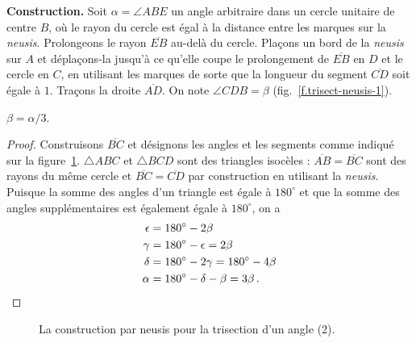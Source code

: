 \noindent\textbf{Construction.}
Soit $\alpha=\angle ABE$ un angle arbitraire dans un cercle unitaire de centre $B$, où le rayon du cercle est égal à la distance entre les marques sur la \emph{neusis}. Prolongeons le rayon $\overline{EB}$ au-delà du cercle. Plaçons un bord de la \emph{neusis} sur $A$ et déplaçons-la  jusqu'à ce qu'elle coupe le prolongement de $\overline{EB}$ en $D$ et le cercle en $C$, en utilisant les marques de sorte que la longueur du segment  $\overline{CD}$ soit égale à $1$. Traçons la droite $\overline{AD}$. On note $\angle CDB=\beta$ (fig.~\ref{f.trisect-neusis-1}).

\begin{theorem} $\beta=\alpha/3$.
\end{theorem}
\begin{proof}
Construisons $\overline{BC}$ et désignons les angles et les segments  comme indiqué sur la figure~\ref{f.trisect-neusis-2}.
$\triangle ABC$ et $\triangle BCD$ sont des triangles isocèles : $\overline{AB} = \overline{BC}$ sont des rayons du même cercle et $\overline{BC} = \overline{CD}$ par construction en utilisant la \emph{neusis}. Puisque la somme des angles d'un triangle est égale à $180^\circ$ et que la somme des angles supplémentaires est également égale à $180^\circ$, on a 
\begin{align*}
\epsilon &= 180^\circ - 2\beta\\
\gamma &= 180^\circ - \epsilon = 2\beta\\
\delta &= 180^\circ - 2\gamma = 180^\circ - 4\beta\\
\alpha &= 180^\circ - \delta - \beta=3\beta\,.\qedhere
\end{align*}
\end{proof}

\begin{figure}[htbp]
\centering
{}
\caption{La construction par neusis pour la trisection d'un angle  (2).}\label{f.trisect-neusis-2}
\end{figure}

